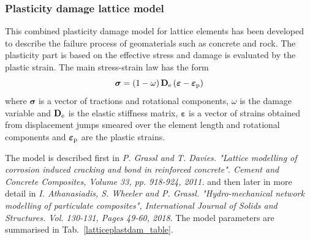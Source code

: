 \documentclass[a4paper]{article}
\begin{document}
\subsubsection{Plasticity damage lattice model}

This combined plasticity damage model for lattice elements has been developed to describe the failure process of geomaterials such as concrete and rock. The plasticity part is based on the effective stress and damage is evaluated by the plastic strain.
The main stress-strain law has the form
\begin{equation}
\boldsymbol{\sigma} = \left(1-\omega\right) \mathbf{D}_{\rm e} \left(\boldsymbol{\varepsilon}-\boldsymbol{\varepsilon}_{\rm p} \right)
\end{equation}
where $\boldsymbol{\sigma}$ is a vector of tractions and rotational components, $\omega$ is the damage variable and $\mathbf{D}_{\rm e}$ is the elastic stiffness matrix, $\boldsymbol{\varepsilon}$ is a vector of strains obtained from displacement jumps smeared over the element length and rotational components and $\boldsymbol{\varepsilon}_{\rm p}$ are the plastic strains.

The model is described first in \textit{P. Grassl and T. Davies. "Lattice modelling of corrosion induced cracking and bond in reinforced concrete". Cement and Concrete Composites, Volume 33, pp. 918-924, 2011.} and then later in more detail in \textit{I. Athanasiadis, S. Wheeler and P. Grassl. "Hydro-mechanical network modelling of particulate composites", International Journal of Solids and Structures. Vol. 130-131, Pages 49-60, 2018}. The model parameters are summarised in Tab.~\ref{latticeplastdam_table}.
\end{document}
